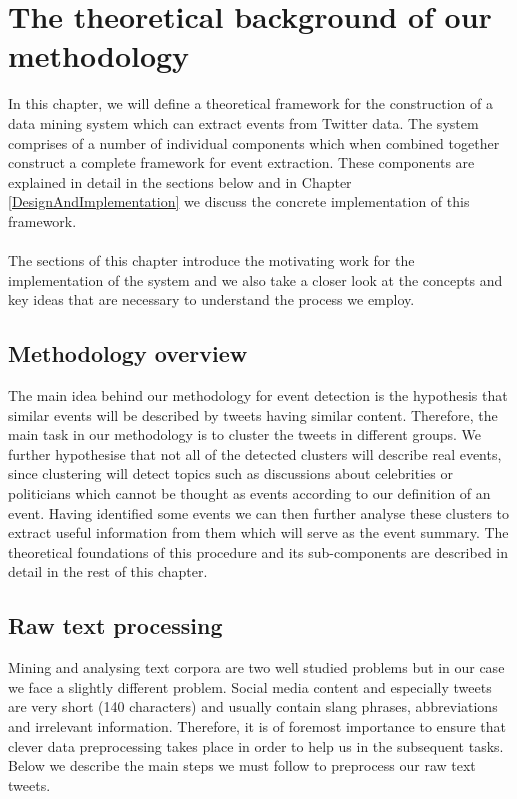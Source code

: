 \chapter{The theoretical background of our methodology}\label{TheoreticalFramework}
\ifpdf
    \graphicspath{{Chapter2/Chapter2Figs/PNG/}{Chapter2/Chapter2Figs/PDF/}{Chapter2/Chapter2Figs/}}
\else
    \graphicspath{{Chapter2/Chapter2Figs/EPS/}{Chapter2/Chapter2Figs/}}
\fi

In this chapter, we will define a theoretical framework for the construction of a 
data mining system which can extract events from Twitter data. The system comprises of a number
of individual components which when combined together construct a complete framework for 
event extraction. These components are explained in detail in the sections below and in 
Chapter \ref{DesignAndImplementation} we discuss the concrete implementation of this framework.\\\\
The sections of this chapter introduce the motivating work for the implementation of the system
and we also take a closer look at the concepts and key ideas that are necessary to understand the process we employ.

\section{Methodology overview}\label{MethodologyOverview}
The main idea behind our methodology for event detection is the hypothesis that similar events will be described by tweets having similar
content. Therefore, the main task in our methodology is to cluster the tweets in different groups. We further hypothesise that not all of the detected
clusters will describe real events, since clustering will detect topics such as discussions about celebrities or politicians which cannot be thought as events
according to our definition of an event. Having identified some events we can then further analyse these clusters to extract useful information from them which 
will serve as the event summary. The theoretical foundations of this procedure and its sub-components are described in detail in the rest of this chapter.  

\section{Raw text processing}\label{RawDataProcessing}
Mining and analysing text corpora are two well studied problems but in our case we face a slightly
different problem. Social media content and especially tweets are very short (140 characters)
and usually contain slang phrases, abbreviations and irrelevant information. Therefore, it is of
foremost importance to ensure that clever data preprocessing takes place in order to help us in
the subsequent tasks. Below we describe the main steps we must follow to preprocess our raw text tweets. 

